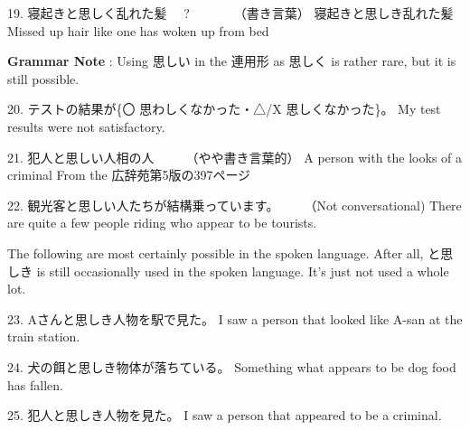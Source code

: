 \par{19. 寝起きと思しく乱れた髪　 ?　　　　（書き言葉） \hfill\break
寝起きと思しき乱れた髪 \hfill\break
Missed up hair like one has woken up from bed }

\par{\textbf{Grammar Note }: Using 思しい in the 連用形 as 思しく is rather rare, but it is still possible. }

\par{20. テストの結果が\{〇 思わしくなかった・△\slash X 思しくなかった\}。 \hfill\break
My test results were not satisfactory. }

\par{21. 犯人と思しい人相の人　　　（やや書き言葉的） \hfill\break
A person with the looks of a criminal \hfill\break
From the 広辞苑第5版の397ページ }

\par{22. 観光客と思しい人たちが結構乗っています。　　　（Not conversational) \hfill\break
There are quite a few people riding who appear to be tourists. }

\par{ The following are most certainly possible in the spoken language. After all, と思しき is still occasionally used in the spoken language. It's just not used a whole lot. }

\par{23. Aさんと思しき人物を駅で見た。 \hfill\break
I saw a person that looked like A-san at the train station. }

\par{24. 犬の餌と思しき物体が落ちている。 \hfill\break
Something what appears to be dog food has fallen. }

\par{25. 犯人と思しき人物を見た。 \hfill\break
I saw a person that appeared to be a criminal. }
    
